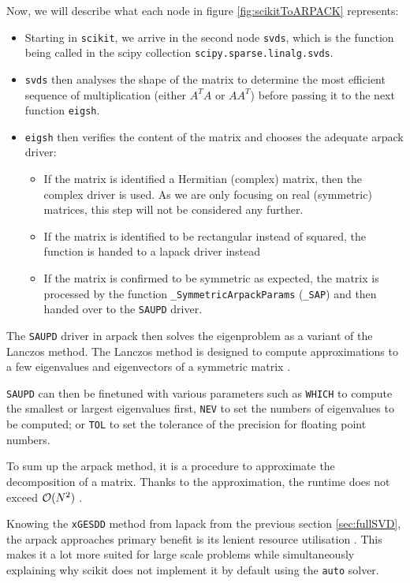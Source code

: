 Now, we will describe what each node in figure \ref{fig:scikitToARPACK} represents:
\begin{itemize}
	\item Starting in \texttt{scikit}, we arrive in the second node \texttt{svds}, which is the function being called in the \gls{scipy} collection \texttt{scipy.sparse.linalg.svds}.
	\item \texttt{svds} then analyses the shape of the matrix to determine the most efficient sequence of multiplication (either $A^TA$ or $AA^T$) before passing it to the next function \texttt{eigsh}.
	\item \texttt{eigsh} then verifies the content of the matrix and chooses the adequate \acrshort{arpack} driver:
	\begin{itemize}
		\item If the matrix is identified a Hermitian (complex) matrix, then the complex driver is used. As we are only focusing on real (symmetric) matrices, this step will not be considered any further.
		\item If the matrix is identified to be rectangular instead of squared, the function is handed to a \acrshort{lapack} driver instead
		\item If the matrix is confirmed to be symmetric as expected, the matrix is processed by the function \texttt{\_SymmetricArpackParams} (\texttt{\_SAP}) and then handed over to the \texttt{SAUPD} driver.
	\end{itemize}
\end{itemize}

The \texttt{SAUPD} driver in \acrshort{arpack} then solves the eigenproblem as a variant of the Lanczos method.
The Lanczos method is designed to compute approximations to a few eigenvalues and eigenvectors of a symmetric matrix \cite{lehoucq1998arpack}.

\texttt{SAUPD} can then be finetuned with various parameters such as \texttt{WHICH} to compute the smallest or largest eigenvalues first, \texttt{NEV} to set the numbers of eigenvalues to be computed; or \texttt{TOL} to set the tolerance of the precision for floating point numbers.
\bigskip

To sum up the \acrshort{arpack} method, it is a procedure to approximate the decomposition of a matrix.
Thanks to the approximation, the runtime does not exceed $\mathcal{O}(N^2)$ \cite{brunton2019data, wright2001large}.

Knowing the \texttt{xGESDD} method from \acrshort{lapack} from the previous section \ref{sec:fullSVD}, the \acrshort{arpack} approaches primary benefit is its lenient resource utilisation \cite{anderson1999lapack}.
This makes it a lot more suited for large scale problems while simultaneously explaining why \gls{scikit} does not implement it by default using the \texttt{auto} solver.

